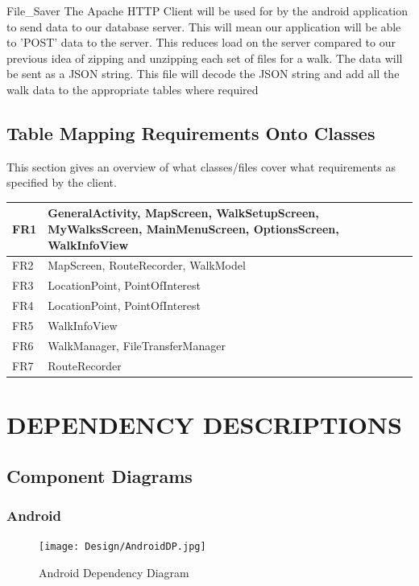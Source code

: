 \documentclass[12pt]{article}
\makeatletter
\renewcommand{\paragraph}{
  \@startsection{paragraph}{4}
  {\z@}{3.25ex \@plus -10em \@minus 1em}{0.1em}
  {\normalfont\normalsize\bfseries}
}
\makeatother
\begin{document}
\paragraph{File\_Saver}
The Apache HTTP Client will be used for by the android application to send data to our database server. This will mean our application will be able to 'POST' data to the server. This reduces load on the server compared to our previous idea of zipping and unzipping each set of files for a walk. The data will be sent as a JSON string. This file will decode the JSON string and add all the walk data to the appropriate tables where required
\subsection{Table Mapping Requirements Onto Classes}
This section gives an overview of what classes/files cover what requirements as specified by the client.

\begin{tabular}{|p{1cm}|p{10cm}|}
\hline
	FR1 & GeneralActivity, MapScreen, WalkSetupScreen, MyWalksScreen, MainMenuScreen, OptionsScreen, WalkInfoView\\
\hline
	FR2 & MapScreen, RouteRecorder, WalkModel\\
\hline
	FR3 & LocationPoint, PointOfInterest\\
\hline
	FR4 & LocationPoint, PointOfInterest\\
\hline
	FR5 & WalkInfoView\\
\hline
	FR6 & WalkManager, FileTransferManager
\\
\hline
	FR7 & RouteRecorder\\
\hline
\end{tabular}
\newpage
\section{DEPENDENCY DESCRIPTIONS}
\subsection{Component Diagrams}
\subsubsection{Android}
\begin{figure}[htp]
\centering
\texttt{[image: Design/AndroidDP.jpg]}
\caption{Android Dependency Diagram}
\label{Android Dependency Diagram}
\end{figure}
\end{document}
